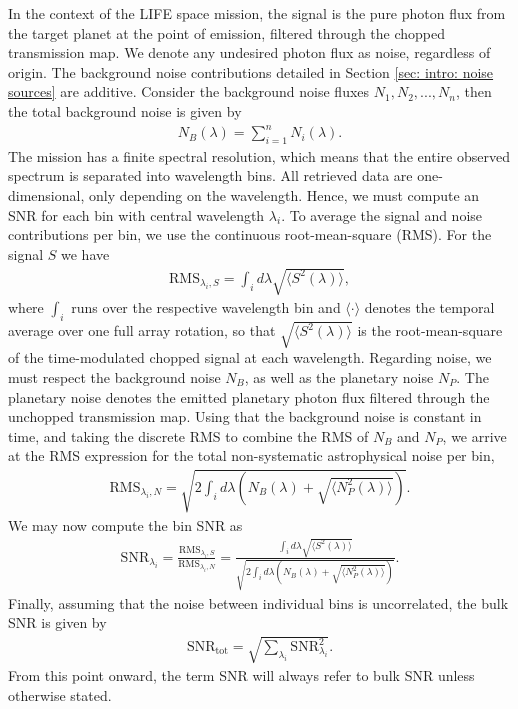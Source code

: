 \documentclass[12pt,a4paper]{article}
\numberwithin{equation}{section}
\numberwithin{figure}{section}
\numberwithin{table}{section}
\begin{document}
In the context of the LIFE space mission, the signal is the pure photon flux from the target planet at the point of emission, filtered through the chopped transmission map. We denote any undesired photon flux as noise, regardless of origin. The background noise contributions detailed in Section \ref{sec: intro: noise sources} are additive. Consider the background noise fluxes $N_1, N_2, ..., N_n$, then the total background noise is given by
\begin{align} \label{eq: additive noise}
    N_B(\lambda) = \sum_{i=1}^{n}N_i(\lambda).
\end{align}
The mission has a finite spectral resolution, which means that the entire observed spectrum is separated into wavelength bins. All retrieved data are one-dimensional, only depending on the wavelength. Hence, we must compute an SNR for each bin with central wavelength $\lambda_i$. To average the signal and noise contributions per bin, we use the continuous root-mean-square (RMS). For the signal $S$ we have
\begin{align}
    \text{RMS}_{\lambda_i, S} = \int_i d \lambda \sqrt{\langle S^2(\lambda)\rangle},
\end{align}
where $\int_i$ runs over the respective wavelength bin and $\langle\cdot\rangle$ denotes the temporal average over one full array rotation, so that $\sqrt{\langle S^2(\lambda)\rangle}$ is the root-mean-square of the time-modulated chopped signal at each wavelength. Regarding noise, we must respect the background noise $N_B$, as well as the planetary noise $N_P$. The planetary noise denotes the emitted planetary photon flux filtered through the unchopped transmission map. Using that the background noise is constant in time, and taking the discrete RMS to combine the RMS of $N_B$ and $N_P$, we arrive at the RMS expression for the total non-systematic astrophysical noise per bin,
\begin{align}
    \text{RMS}_{\lambda_i, N} = \sqrt{2\int_i d\lambda(N_B(\lambda) + \sqrt{\langle N_P^2(\lambda)\rangle})}.
\end{align}
We may now compute the bin SNR as
\begin{align} \label{eq: bin snr}
    \text{SNR}_{\lambda_i} = \frac{\text{RMS}_{\lambda_i,
    S}}{\text{RMS}_{\lambda_i, N}} = \frac{\int_i d\lambda \sqrt{\langle S^2(\lambda)\rangle}}{\sqrt{2\int_i d\lambda(N_B(\lambda) + \sqrt{\langle N_P^2(\lambda)\rangle})}}.
\end{align}
Finally, assuming that the noise between individual bins is uncorrelated, the bulk SNR is given by
\begin{align} \label{eq: bulk snr}
    \text{SNR}_\text{tot} = \sqrt{\sum_{\lambda_i}\text{SNR}_{\lambda_i}^2}.
\end{align}
From this point onward, the term SNR will always refer to bulk SNR unless otherwise stated.
\end{document}
